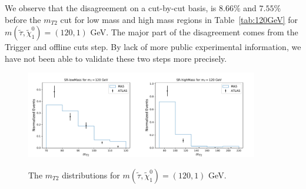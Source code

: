 \documentclass{ws-mpla}
\begin{document}
We observe that the disagreement on a cut-by-cut basis, is $8.66\%$ and $7.55\%$ before the $m_{T2}$ cut for {\color{blue}low mass} and {\color{blue}high mass regions} in Table~\ref{tab:120GeV} for $m(\tilde{\tau},\tilde{\chi}^0_1)=(120,1) $ GeV. The major part of the disagreement comes from the Trigger and offline cuts step. By lack of more public experimental information, we have not been able to validate these two steps more precisely.
\begin{figure}[h!]
  \centerline{\includegraphics[width=2.0in]{m120_norm_1}\includegraphics[width=2.0in]{m120_norm_2}}
  \vspace*{8pt}
  \caption{The $m_{T2}$ distributions for $m(\tilde{\tau},\tilde{\chi}^0_1)=(120,1)$ GeV.\protect\label{fig:m120_norm}}
\end{figure}
\end{document}
